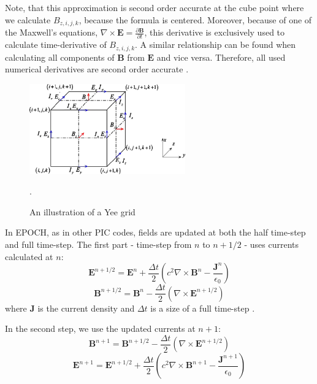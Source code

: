 Note, that this approximation is second order accurate at the cube point where we calculate $B_{z,i,j,k}$, because the formula is centered. Moreover, because of one of the Maxwell's equations, $\nabla \times \bm{E} = \frac{\partial \bm{B}}{\partial t}$, this derivative is exclusively used to calculate time-derivative of $B_{z,i,j,k}$. A similar relationship can be found when calculating all components of $\bm{B}$ from $\bm{E}$ and vice versa. Therefore, all used numerical derivatives are second order accurate \cite{arber2015}.

\begin{figure}[t]
	\centering
	\includegraphics[width=0.6\textwidth]{figures/yee-grid}
	\caption{An illustration of a Yee grid \cite{wang2010}}.
	\label{fig:yee-grid}
\end{figure}

In EPOCH, as in other PIC codes, fields are updated at both the half time-step and full time-step. The first part - time-step from $n$ to $n+1/2$ - uses currents calculated at $n$:
\begin{equation}
	\bm{E}^{n+1/2} = \bm{E}^n + \frac{\Delta t}{2}\left(c^2 \nabla\times\bm{B}^n - \frac{\bm{J}^n}{\epsilon_0}\right)
\end{equation}
\begin{equation} 
	\bm{B}^{n+1/2} = \bm{B}^n - \frac{\Delta t}{2}\left(\nabla\times\bm{E}^{n+1/2} \right)
\end{equation}
where $\bm{J}$ is the current density and $\Delta t$ is a size of a full time-step \cite{arber2015}.

In the second step, we use the updated currents at $n+1$:
\begin{equation} 
	\bm{B}^{n+1} = \bm{B}^{n+1/2} - \frac{\Delta t}{2}\left(\nabla\times\bm{E}^{n+1/2} \right)
\end{equation}
\begin{equation}
	\bm{E}^{n+1} = \bm{E}^{n+1/2} + \frac{\Delta t}{2}\left(c^2 \nabla\times\bm{B}^{n+1} - \frac{\bm{J}^{n+1}}{\epsilon_0}\right)
\end{equation}

